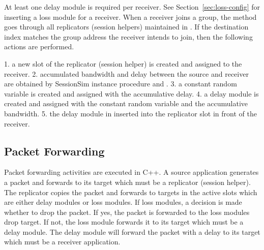 At least one delay module is required per receiver.
See Section~\ref{sec:loss-config} for inserting a loss module for a receiver.
When a receiver joins a group, 
the  method goes through
all replicators (session helpers) maintained in .
If the destination index matches the group address
the receiver intends to join, then the following actions are performed.

1. a new slot of the replicator (session helper) is created and assigned to the receiver.
2. accumulated bandwidth and delay between the source and receiver are obtained by SessionSim instance procedure  and .
3. a constant random variable is created and assigned with the
accumulative delay.
4. a delay module is created and assigned with the constant random 
variable and the accumulative bandwidth.
5. the delay module in inserted into the replicator slot in
front of the receiver.



\subsection{Packet Forwarding}
Packet forwarding activities are executed in C++.  A source application 
generates a packet and forwards to its target which must be a replicator 
(session helper).  The replicator copies the packet and forwards 
to targets in the active slots which are either delay modules or loss modules. If loss modules, a decision is made whether to drop the packet.
If yes, the packet is forwarded to the loss modules drop target.  If not,
the loss module forwards it to its target which must be a delay module.
The delay module will forward the packet with a delay to its target which
must be a receiver application.


